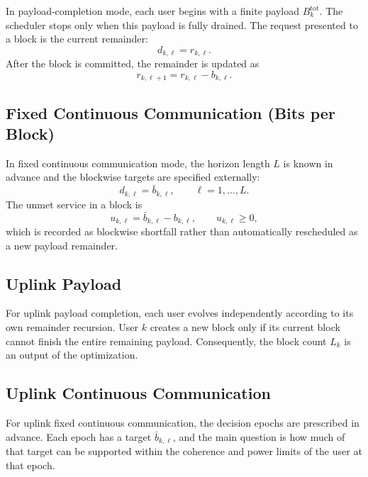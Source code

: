\documentclass[11pt]{article}
\begin{document}
In payload-completion mode, each user begins with a finite payload
$B_k^{\mathrm{tot}}$. The scheduler stops only when this payload is fully
drained. The request presented to a block is the current remainder:
\begin{equation}
d_{k,\ell}=r_{k,\ell}.
\label{eq:payload-request}
\end{equation}
After the block is committed, the remainder is updated as
\begin{equation}
r_{k,\ell+1}=r_{k,\ell}-b_{k,\ell}.
\label{eq:payload-update}
\end{equation}

\subsection{Fixed Continuous Communication (Bits per Block)}

In fixed continuous communication mode, the horizon length $L$ is known in
advance and the blockwise targets are specified externally:
\begin{equation}
d_{k,\ell}=\bar b_{k,\ell},
\qquad \ell=1,\dots,L.
\label{eq:fixed-request}
\end{equation}
The unmet service in a block is
\begin{equation}
u_{k,\ell}=\bar b_{k,\ell}-b_{k,\ell},
\qquad
u_{k,\ell}\ge 0,
\label{eq:fixed-shortfall}
\end{equation}
which is recorded as blockwise shortfall rather than automatically rescheduled
as a new payload remainder.

\subsection{Uplink Payload}

For uplink payload completion, each user evolves independently according to its
own remainder recursion. User $k$ creates a new block only if its current block
cannot finish the entire remaining payload. Consequently, the block count
$L_k$ is an output of the optimization.

\subsection{Uplink Continuous Communication}

For uplink fixed continuous communication, the decision epochs are prescribed in
advance. Each epoch has a target $\bar b_{k,\ell}$, and the main question is
how much of that target can be supported within the coherence and power limits
of the user at that epoch.
\end{document}
